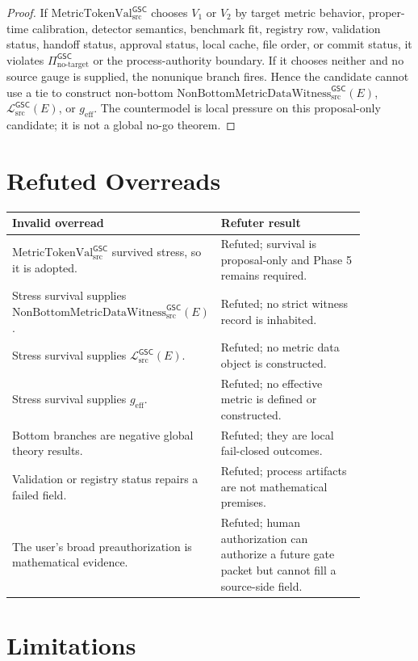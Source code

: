 \documentclass[11pt]{article}
\newcommand{\MetricTokenVal}{\mathrm{MetricTokenVal}_{\mathrm{src}}^{\mathsf{GSC}}}
\newcommand{\NoTarget}{\Pi_{\mathrm{no\mbox{-}target}}^{\mathsf{GSC}}}
\newcommand{\MetricData}{\mathcal{L}_{\mathrm{src}}^{\mathsf{GSC}}}
\newcommand{\Witness}{\mathrm{NonBottomMetricDataWitness}_{\mathrm{src}}^{\mathsf{GSC}}}
\newcommand{\geff}{g_{\mathrm{eff}}}
\begin{document}
\begin{proof}
If \(\MetricTokenVal\) chooses \(V_1\) or \(V_2\) by target metric behavior,
proper-time calibration, detector semantics, benchmark fit, registry row,
validation status, handoff status, approval status, local cache, file order,
or commit status, it violates \(\NoTarget\) or the process-authority boundary.
If it chooses neither and no source gauge is supplied, the nonunique branch
fires. Hence the candidate cannot use a tie to construct non-bottom
\(\Witness(E)\), \(\MetricData(E)\), or \(\geff\). The countermodel is local
pressure on this proposal-only candidate; it is not a global no-go theorem.
\end{proof}

\section{Refuted Overreads}

\begin{center}
\begin{tabular}{p{0.42\linewidth}p{0.45\linewidth}}
\toprule
Invalid overread & Refuter result \\
\midrule
\(\MetricTokenVal\) survived stress, so it is adopted. & Refuted; survival is proposal-only and Phase 5 remains required. \\
Stress survival supplies \(\Witness(E)\). & Refuted; no strict witness record is inhabited. \\
Stress survival supplies \(\MetricData(E)\). & Refuted; no metric data object is constructed. \\
Stress survival supplies \(\geff\). & Refuted; no effective metric is defined or constructed. \\
Bottom branches are negative global theory results. & Refuted; they are local fail-closed outcomes. \\
Validation or registry status repairs a failed field. & Refuted; process artifacts are not mathematical premises. \\
The user's broad preauthorization is mathematical evidence. & Refuted; human authorization can authorize a future gate packet but cannot fill a source-side field. \\
\bottomrule
\end{tabular}
\end{center}

\section{Limitations}
\end{document}
